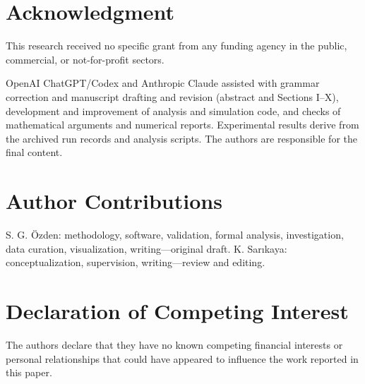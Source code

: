 \documentclass[journal]{IEEEtran}
\begin{document}
\section*{Acknowledgment}
This research received no specific grant from any funding agency in the public, commercial, or not-for-profit sectors.

OpenAI ChatGPT/Codex and Anthropic Claude assisted with grammar correction and manuscript drafting and revision (abstract and Sections I--X), development and improvement of analysis and simulation code, and checks of mathematical arguments and numerical reports. Experimental results derive from the archived run records and analysis scripts. The authors are responsible for the final content.

\section*{Author Contributions}
S. G. \"Ozden: methodology, software, validation, formal analysis, investigation, data curation, visualization, writing---original draft. K. Sar{\i}kaya: conceptualization, supervision, writing---review and editing.

\section*{Declaration of Competing Interest}
The authors declare that they have no known competing financial interests or personal relationships that could have appeared to influence the work reported in this paper.



\end{document}
